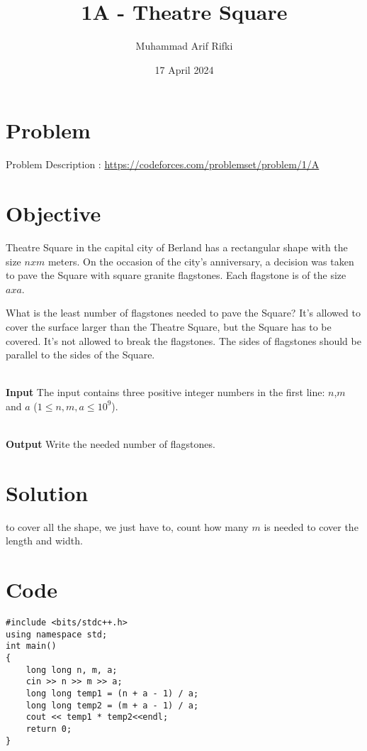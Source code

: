 \documentclass{article}
\title{1A -  Theatre Square}
\author{Muhammad Arif Rifki}
\date{17 April 2024}
\begin{document}
\maketitle


\section{Problem}

Problem Description : \href{https://codeforces.com/problemset/problem/1/A}{https://codeforces.com/problemset/problem/1/A}

\section{Objective}
Theatre Square in the capital city of Berland has a rectangular shape with the size $nxm$ meters. On the occasion of the city's anniversary, a decision was taken to pave the Square with square granite flagstones. Each flagstone is of the size $axa$.

What is the least number of flagstones needed to pave the Square? It's allowed to cover the surface larger than the Theatre Square, but the Square has to be covered. It's not allowed to break the flagstones. The sides of flagstones should be parallel to the sides of the Square.

\\\textbf{Input}
The input contains three positive integer numbers in the first line: $n$,$m$ and $a$ ($1 \leq n, m, a \leq 10^9$).

\\\textbf{Output}
Write the needed number of flagstones.
\section{Solution}

to cover all the shape, we just have to, count how many $m$ is needed to cover the length and width.


\newpage
\section{Code}

\begin{lstlisting}
#include <bits/stdc++.h>
using namespace std;
int main()
{
    long long n, m, a;
    cin >> n >> m >> a;
    long long temp1 = (n + a - 1) / a;
    long long temp2 = (m + a - 1) / a;
    cout << temp1 * temp2<<endl;
    return 0;
}

\end{lstlisting}
\end{document}
